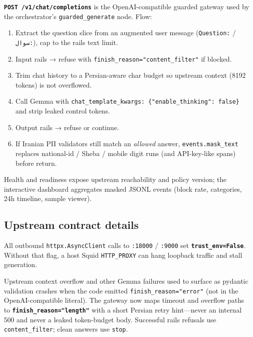 \documentclass[
  11pt,
]{article}
\providecommand{\tightlist}{%
  \setlength{\itemsep}{0pt}\setlength{\parskip}{0pt}}
\begin{document}
\textbf{\texttt{POST\ /v1/chat/completions}} is the OpenAI-compatible
guarded gateway used by the orchestrator's \texttt{guarded\_generate}
node. Flow:

\begin{enumerate}
\def\labelenumi{\arabic{enumi}.}
\tightlist
\item
  Extract the question slice from an augmented user message
  (\texttt{Question:} / \texttt{سوال:}), cap to the rails text limit.
\item
  Input rails → refuse with \texttt{finish\_reason="content\_filter"} if
  blocked.
\item
  Trim chat history to a Persian-aware char budget so upstream context
  (8192 tokens) is not overflowed.
\item
  Call Gemma with
  \texttt{chat\_template\_kwargs:\ \{"enable\_thinking":\ false\}} and
  strip leaked control tokens.
\item
  Output rails → refuse or continue.
\item
  If Iranian PII validators still match an \emph{allowed} answer,
  \texttt{events.mask\_text} replaces national-id / Sheba / mobile digit
  runs (and API-key-like spans) before return.
\end{enumerate}

Health and readiness expose upstream reachability and policy version;
the interactive dashboard aggregates masked JSONL events (block rate,
categories, 24h timeline, sample viewer).

\subsection{Upstream contract details}\label{upstream-contract-details}

All outbound \texttt{httpx.AsyncClient} calls to \texttt{:18000} /
\texttt{:9000} set \textbf{\texttt{trust\_env=False}}. Without that
flag, a host Squid \texttt{HTTP\_PROXY} can hang loopback traffic and
stall generation.

Upstream context overflow and other Gemma failures used to surface as
pydantic validation crashes when the code emitted
\texttt{finish\_reason="error"} (not in the OpenAI-compatible literal).
The gateway now maps timeout and overflow paths to
\textbf{\texttt{finish\_reason="length"}} with a short Persian retry
hint---never an internal 500 and never a leaked token-budget body.
Successful rails refusals use \texttt{content\_filter}; clean answers
use \texttt{stop}.
\end{document}
